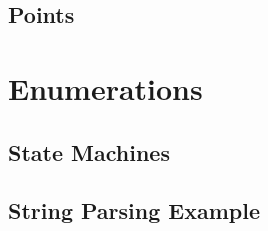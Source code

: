 \subsection{Points}

\section{Enumerations}

\subsection{State Machines}

\subsection{String Parsing Example}

